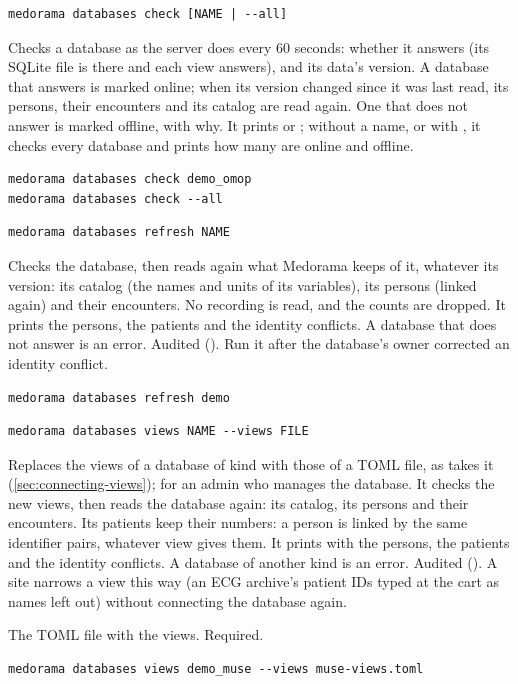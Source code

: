 \begin{lstlisting}[style=signature]
medorama databases check [NAME | --all]
\end{lstlisting}
Checks a database as the server does every 60 seconds: whether it answers (its SQLite file is
there and each view answers), and its data's version. A database that answers is marked online;
when its version changed since it was last read, its persons, their encounters and its catalog
are read again. One that does not answer is marked offline, with why. It prints  or
; without a name, or with , it checks every database and
prints how many are online and offline.
\begin{lstlisting}[style=shell]
medorama databases check demo_omop
medorama databases check --all
\end{lstlisting}

\begin{lstlisting}[style=signature]
medorama databases refresh NAME
\end{lstlisting}
Checks the database, then reads again what Medorama keeps of it, whatever its version: its
catalog (the names and units of its variables), its persons (linked again) and their encounters.
No recording is read, and the counts are dropped. It prints the persons, the patients and the
identity conflicts. A database that does not answer is an error. Audited (). Run it
after the database's owner corrected an identity conflict.
\begin{lstlisting}[style=shell]
medorama databases refresh demo
\end{lstlisting}

\begin{lstlisting}[style=signature]
medorama databases views NAME --views FILE
\end{lstlisting}
Replaces the views of a database of kind  with those of a TOML file, as
 takes it (\cref{sec:connecting-views}); for an admin who
manages the database. It checks the new views, then reads the database again: its catalog, its
persons and their encounters. Its patients keep their numbers: a person is linked by the same
identifier pairs, whatever view gives them. It prints  with the persons,
the patients and the identity conflicts. A database of another kind is an error. Audited
(). A site narrows a view this way (an ECG archive's patient IDs typed at the cart as
names left out) without connecting the database again.
\begin{params}
\item[--views FILE] The TOML file with the views. Required.
\end{params}
\begin{lstlisting}[style=shell]
medorama databases views demo_muse --views muse-views.toml
\end{lstlisting}

